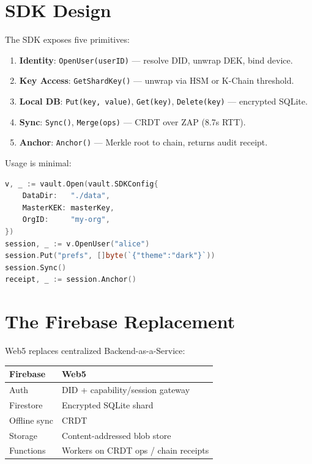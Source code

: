 \documentclass[twocolumn,11pt]{article}
\begin{document}
\section{SDK Design}

The SDK exposes five primitives:

\begin{enumerate}
\item \textbf{Identity}: \texttt{OpenUser(userID)} --- resolve DID, unwrap DEK, bind device.
\item \textbf{Key Access}: \texttt{GetShardKey()} --- unwrap via HSM or K-Chain threshold.
\item \textbf{Local DB}: \texttt{Put(key, value)}, \texttt{Get(key)}, \texttt{Delete(key)} --- encrypted SQLite.
\item \textbf{Sync}: \texttt{Sync()}, \texttt{Merge(ops)} --- CRDT over ZAP (8.7\textmu{}s RTT).
\item \textbf{Anchor}: \texttt{Anchor()} --- Merkle root to chain, returns audit receipt.
\end{enumerate}

Usage is minimal:

\begin{lstlisting}[language=Go]
v, _ := vault.Open(vault.SDKConfig{
    DataDir:   "./data",
    MasterKEK: masterKey,
    OrgID:     "my-org",
})
session, _ := v.OpenUser("alice")
session.Put("prefs", []byte(`{"theme":"dark"}`))
session.Sync()
receipt, _ := session.Anchor()
\end{lstlisting}

\section{The Firebase Replacement}

Web5 replaces centralized Backend-as-a-Service:

\begin{center}
\begin{tabular}{ll}
\toprule
\textbf{Firebase} & \textbf{Web5} \\
\midrule
Auth & DID + capability/session gateway \\
Firestore & Encrypted SQLite shard \\
Offline sync & CRDT \\
Storage & Content-addressed blob store \\
Functions & Workers on CRDT ops / chain receipts \\
\bottomrule
\end{tabular}
\end{center}
\end{document}
